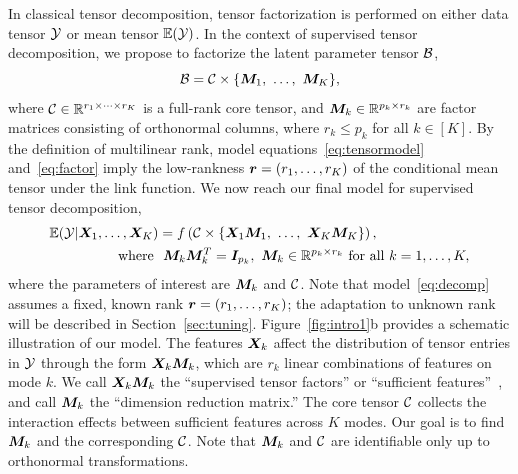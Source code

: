 \documentclass[12pt]{article}
\theoremstyle{plain}
\theoremstyle{definition}
\begin{document}
In classical tensor decomposition, tensor factorization is performed on either data tensor $\mathcal{Y}$ or mean tensor $\mathbb{E}(\mathcal{Y})$. In the context of supervised tensor decomposition, we propose to factorize the latent parameter tensor $\mathcal{B}$,
\begin{equation}\label{eq:factor}
\mathcal{B}=\mathcal{C}\times\{\bm M_1,\ \ldots,\ \bm M_K\},
\end{equation}
where $\mathcal{C}\in\mathbb{R}^{r_1\times \cdots \times r_K}$ is a full-rank core tensor, and $\bm M_k\in\mathbb{R}^{p_k\times r_k}$ are factor matrices consisting of orthonormal columns, where $r_k\leq p_k$ for all $k\in[K]$. By the definition of multilinear rank, model equations~\eqref{eq:tensormodel} and~\eqref{eq:factor} imply the low-rankness $\bm{r}=(r_1,\ldots,r_K)$ of the conditional mean tensor under the link function. We now reach our final model for supervised tensor decomposition,
\begin{align}\label{eq:decomp}
\mathbb{E}(\tY|\mX_1,\ldots,\mX_K) &= f\left(\tC\times\{\mX_1\mM_1,\ \ldots,\ \mX_K\mM_K\}\right),\notag\\
\text{where} \ &\ \mM_k\mM^T_k=\mI_{p_k},\ \mM_k\in\mathbb{R}^{p_k\times r_k}\ \text{for all }k=1,\ldots,K,
\end{align}
where the parameters of interest are $\bm M_k$ and $\mathcal{C}$. Note that model~\eqref{eq:decomp} assumes a fixed, known rank $\bm{r}=(r_1,\ldots,r_K)$; the adaptation to unknown rank will be described in Section~\ref{sec:tuning}. Figure~\ref{fig:intro1}b provides a schematic illustration of our model. The features $\bm X_k$ affect the distribution of tensor entries in $\mathcal{Y}$ through the form $\bm X_k\bm M_k$, which are $r_k$ linear combinations of features on mode $k$. We call $\bm X_k\bm M_k$ the ``supervised tensor factors'' or ``sufficient features''~\citep{adragni2009sufficient}, and call $\bm M_k$ the ``dimension reduction matrix.'' The core tensor $\mathcal{C}$ collects the interaction effects between sufficient features across $K$ modes. Our goal is to find $\bm M_k$ and the corresponding $\mathcal{C}$. Note that $\bm M_k$ and $\mathcal{C}$ are identifiable only up to orthonormal transformations.  
\end{document}
